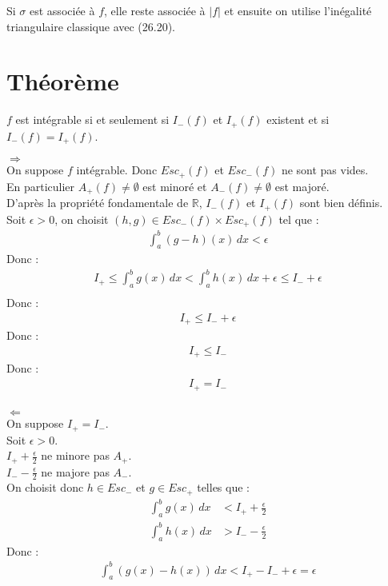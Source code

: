 \documentclass[../main.tex]{subfiles}
\begin{document}
\noindent Si $\sigma$ est associée à $f$, elle reste associée à $|f|$ et ensuite on utilise l'inégalité triangulaire classique avec (26.20). 

\section{Théorème}
\begin{tcolorbox}[title=Théorème 26.36, title filled=false, colframe=orange, colback=orange!10!white]
    $f$ est intégrable si et seulement si $I_-(f)$ et $I_+(f)$ existent et si $I_-(f) = I_+(f)$.
\end{tcolorbox}

$\boxed{\Rightarrow}$ \\
On suppose $f$ intégrable. Donc $Esc_+(f)$ et $Esc_-(f)$ ne sont pas vides. \\
En particulier $A_+(f) \neq \emptyset$ est minoré et $A_-(f) \neq \emptyset$ est majoré. \\
D'après la propriété fondamentale de $\mathbb{R}$, $I_-(f)$ et $I_+(f)$ sont bien définis. \\
Soit $\epsilon > 0$, on choisit $(h, g) \in Esc_-(f) \times Esc_+(f)$ tel que : 
\begin{align*}
    \int_{a}^{b} (g - h)(x) \,dx < \epsilon
\end{align*}
Donc : 
\begin{align*}
   I_+ \leq \int_{a}^{b} g(x) \,dx < \int_{a}^{b} h(x) \,dx + \epsilon \leq I_- + \epsilon \\
\end{align*}
Donc : 
\begin{align*}
    I_+ \leq I_- + \epsilon
\end{align*}
Donc :
\begin{align*}
    I_+ \leq I_-
\end{align*}
Donc : 
\begin{align*}
    I_+ = I_-
\end{align*} \\

$\boxed{\Leftarrow}$ \\
On suppose $I_+ = I_-$. \\
Soit $\epsilon > 0$. \\
$I_+ + \frac{\epsilon}{2}$ ne minore pas $A_+$. \\
$I_- - \frac{\epsilon}{2}$ ne majore pas $A_-$. \\
On choisit donc $h\in Esc_-$ et $g\in Esc_+$ telles que : 
\begin{align*}
    \int_{a}^{b} g(x) \,dx &< I_+ + \frac{\epsilon}{2} \\
    \int_{a}^{b} h(x) \,dx &> I_- - \frac{\epsilon}{2}
\end{align*}
Donc :
\begin{align*}
    \int_{a}^{b} (g(x) - h(x)) \,dx < I_+ - I_- + \epsilon = \epsilon 
\end{align*}
\end{document}
